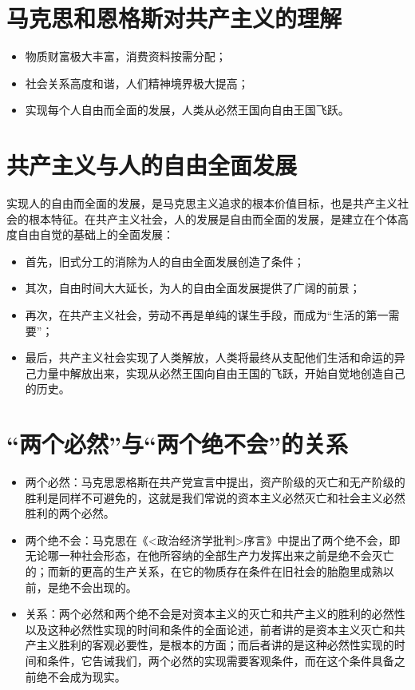 \documentclass[12pt,openany]{ctexbook}
\begin{document}
\section{马克思和恩格斯对共产主义的理解}
\begin{itemize}
  \item 物质财富极大丰富，消费资料按需分配；
  \item 社会关系高度和谐，人们精神境界极大提高；
  \item 实现每个人自由而全面的发展，人类从必然王国向自由王国飞跃。
\end{itemize}
\section{共产主义与人的自由全面发展}
实现人的自由而全面的发展，是马克思主义追求的根本价值目标，也是共产主义社会的根本特征。在共产主义社会，人的发展是自由而全面的发展，是建立在个体高度自由自觉的基础上的全面发展：
\begin{itemize}
  \item 首先，旧式分工的消除为人的自由全面发展创造了条件；
  \item 其次，自由时间大大延长，为人的自由全面发展提供了广阔的前景；
  \item 再次，在共产主义社会，劳动不再是单纯的谋生手段，而成为“生活的第一需要”；
  \item 最后，共产主义社会实现了人类解放，人类将最终从支配他们生活和命运的异己力量中解放出来，实现从必然王国向自由王国的飞跃，开始自觉地创造自己的历史。
\end{itemize}
\section{“两个必然”与“两个绝不会”的关系}
\begin{itemize}
  \item 两个必然：马克思恩格斯在共产党宣言中提出，资产阶级的灭亡和无产阶级的胜利是同样不可避免的，这就是我们常说的资本主义必然灭亡和社会主义必然胜利的两个必然。
  \item 两个绝不会：马克思在《\textless{}政治经济学批判\textgreater{}序言》中提出了两个绝不会，即无论哪一种社会形态，在他所容纳的全部生产力发挥出来之前是绝不会灭亡的；而新的更高的生产关系，在它的物质存在条件在旧社会的胎胞里成熟以前，是绝不会出现的。
  \item 关系：两个必然和两个绝不会是对资本主义的灭亡和共产主义的胜利的必然性以及这种必然性实现的时间和条件的全面论述，前者讲的是资本主义灭亡和共产主义胜利的客观必要性，是根本的方面；而后者讲的是这种必然性实现的时间和条件，它告诫我们，两个必然的实现需要客观条件，而在这个条件具备之前绝不会成为现实。
\end{itemize}
\end{document}

